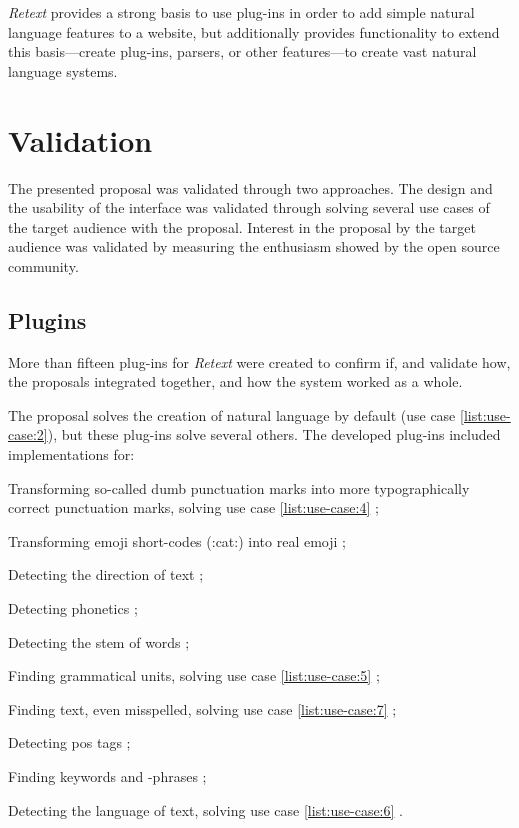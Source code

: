 \emph{Retext} provides a strong basis to use plug-ins in order to add simple
  natural language features to a website, but additionally provides
  functionality to extend this basis---create plug-ins, parsers, or other
  features---to create vast natural language systems.

\chapter{Validation}\label{validation}

The presented proposal was validated through two approaches.
The design and the usability of the interface was validated through
  solving several use cases of the target audience with the proposal.
Interest in the proposal by the target audience was validated by
  measuring the enthusiasm showed by the open source community.

\section{Plugins}\label{plugins}

More than fifteen plug-ins for \emph{Retext} were created to confirm if,
  and validate how, the proposals integrated together, and how the system
  worked as a whole.

The proposal solves the creation of natural language by default (use case
  \ref{list:use-case:2}), but these plug-ins solve several others.
The developed plug-ins included implementations for:

\begin{aenumerate}
\item Transforming so-called dumb punctuation marks into more
  typographically correct punctuation marks, solving use case
  \ref{list:use-case:4} \autocite*{wooorm/retext-smartypants-source-code};
\item Transforming emoji short-codes (:cat:) into real emoji
  \autocite*{wooorm/retext-emoji-source-code};
\item Detecting the direction of text
  \autocite*{wooorm/retext-directionality-source-code};
\item Detecting phonetics
  \autocite*{wooorm/retext-double-metaphone-source-code};
\item Detecting the stem of words
  \autocite*{wooorm/retext-porter-stemmer-source-code};
\item Finding grammatical units, solving use case
  \ref{list:use-case:5}  \autocite*{wooorm/retext-visit-source-code};
\item Finding text, even misspelled, solving use case
  \ref{list:use-case:7} \autocite*{wooorm/retext-search-source-code};
\item Detecting \gls{pos} tags \autocite*{wooorm/retext-pos-source-code};
\item Finding keywords and -phrases
  \autocite*{wooorm/retext-keywords-source-code};
\item Detecting the language of text, solving use case \ref{list:use-case:6} 
  \autocite*{wooorm/retext-language-source-code}.
\end{aenumerate}

